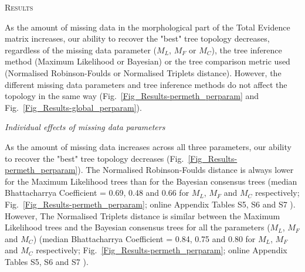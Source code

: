\documentclass[12pt,letterpaper]{article}
\renewcommand{\section}[1]{%
\bigskip
\begin{center}
\begin{Large}
\normalfont\scshape #1
\medskip
\end{Large}
\end{center}}
\renewcommand{\subsection}[1]{%
\bigskip
\begin{center}
\begin{large}
\normalfont\itshape #1
\end{large}
\end{center}}
\begin{document}
%
%

\section{Results}
As the amount of missing data in the morphological part of the Total Evidence matrix increases, our ability to recover the "best" tree topology decreases, regardless of the missing data parameter ($M_{L}$, $M_{F}$ or $M_{C}$), the tree inference method (Maximum Likelihood or Bayesian) or the tree comparison metric used (Normalised Robinson-Foulds or Normalised Triplets distance). However, the different missing data parameters and tree inference methods do not affect the topology in the same way (Fig.~\ref{Fig_Results-permeth_perparam} and Fig.~\ref{Fig_Results-global_perparam}).

\subsection{Individual effects of missing data parameters}
As the amount of missing data increases across all three parameters, our ability to recover the "best" tree topology decreases (Fig.~\ref{Fig_Results-permeth_perparam}).
The Normalised Robinson-Foulds distance is always lower for the Maximum Likelihood
 trees than for the Bayesian consensus trees (median Bhattacharrya Coefficient = 0.69, 0.48 and 0.66 for $M_{L}$, $M_{F}$ and $M_{C}$ respectively; Fig.~\ref{Fig_Results-permeth_perparam}; online Appendix Tables %
S5, S6 and S7 %
). 
However, The Normalised Triplets distance is similar between the Maximum Likelihood trees and the Bayesian consensus trees for all the parameters ($M_{L}$, $M_{F}$ and $M_{C}$) (median Bhattacharrya Coefficient = 0.84, 0.75 and 0.80 for $M_{L}$, $M_{F}$ and $M_{C}$ respectively; Fig.~\ref{Fig_Results-permeth_perparam}; online Appendix Tables %
S5, S6 and S7 %
).
\end{document}
